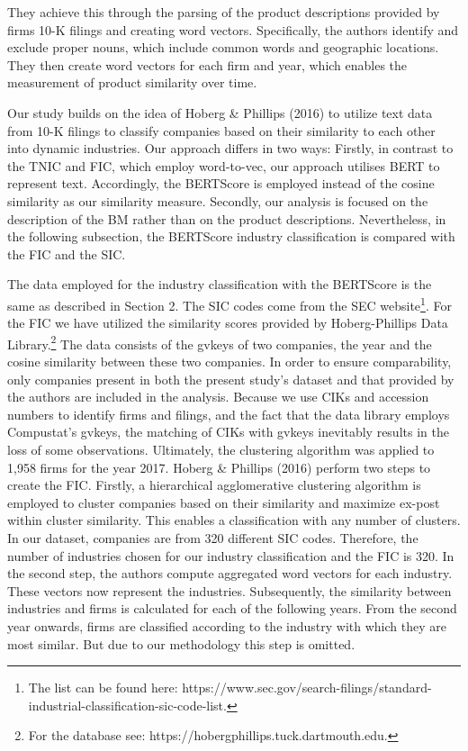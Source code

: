 \documentclass[
]{article}
\begin{document}
They achieve this through the parsing of the product descriptions
provided by firms 10-K filings and creating word vectors. Specifically,
the authors identify and exclude proper nouns, which include common
words and geographic locations. They then create word vectors for each
firm and year, which enables the measurement of product similarity over
time.

Our study builds on the idea of Hoberg \& Phillips (2016) to utilize
text data from 10-K filings to classify companies based on their
similarity to each other into dynamic industries. Our approach differs
in two ways: Firstly, in contrast to the TNIC and FIC, which employ
word-to-vec, our approach utilises BERT to represent text. Accordingly,
the BERTScore is employed instead of the cosine similarity as our
similarity measure. Secondly, our analysis is focused on the description
of the BM rather than on the product descriptions. Nevertheless, in the
following subsection, the BERTScore industry classification is compared
with the FIC and the SIC.

The data employed for the industry classification with the BERTScore is
the same as described in Section 2. The SIC codes come from the SEC
website\footnote{The list can be found here:
  https://www.sec.gov/search-filings/standard-industrial-classification-sic-code-list.}.
For the FIC we have utilized the similarity scores provided by
Hoberg-Phillips Data Library.\footnote{For the database see:
  https://hobergphillips.tuck.dartmouth.edu.} The data consists of the
gvkeys of two companies, the year and the cosine similarity between
these two companies. In order to ensure comparability, only companies
present in both the present study's dataset and that provided by the
authors are included in the analysis. Because we use CIKs and accession
numbers to identify firms and filings, and the fact that the data
library employs Compustat's gvkeys, the matching of CIKs with gvkeys
inevitably results in the loss of some observations. Ultimately, the
clustering algorithm was applied to 1,958 firms for the year 2017.
Hoberg \& Phillips (2016) perform two steps to create the FIC. Firstly,
a hierarchical agglomerative clustering algorithm is employed to cluster
companies based on their similarity and maximize ex-post within cluster
similarity. This enables a classification with any number of clusters.
In our dataset, companies are from 320 different SIC codes. Therefore,
the number of industries chosen for our industry classification and the
FIC is 320. In the second step, the authors compute aggregated word
vectors for each industry. These vectors now represent the industries.
Subsequently, the similarity between industries and firms is calculated
for each of the following years. From the second year onwards, firms are
classified according to the industry with which they are most similar.
But due to our methodology this step is omitted.
\end{document}

